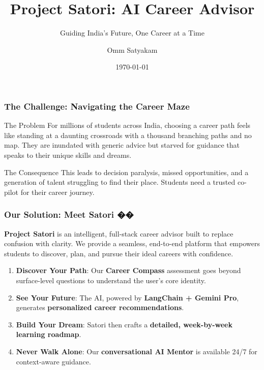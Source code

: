 \documentclass{beamer}
\title[Project Satori]{Project Satori: AI Career Advisor}
\subtitle{Guiding India's Future, One Career at a Time}
\author{Omm Satyakam}
\institute{Team Satori}
\date{\today}
\begin{document}
\begin{frame}
  \titlepage
\end{frame}

\begin{frame}
  \frametitle{The Challenge: Navigating the Career Maze}
  \begin{block}{The Problem}
    For millions of students across India, choosing a career path feels like standing at a daunting crossroads with a thousand branching paths and no map. They are inundated with generic advice but starved for guidance that speaks to their unique skills and dreams.
  \end{block}
  \begin{alertblock}{The Consequence}
    This leads to decision paralysis, missed opportunities, and a generation of talent struggling to find their place. Students need a trusted co-pilot for their career journey.
  \end{alertblock}
\end{frame}

\begin{frame}
  \frametitle{Our Solution: Meet Satori ��}
  \textbf{Project Satori} is an intelligent, full-stack career advisor built to replace confusion with clarity. We provide a seamless, end-to-end platform that empowers students to discover, plan, and pursue their ideal careers with confidence.
  \vspace{0.5cm}
  \begin{enumerate}
  \item \textbf{Discover Your Path}: Our \textbf{Career Compass} assessment goes beyond surface-level questions to understand the user's core identity.
  \item \textbf{See Your Future}: The AI, powered by \textbf{LangChain + Gemini Pro}, generates \textbf{personalized career recommendations}.
  \item \textbf{Build Your Dream}: Satori then crafts a \textbf{detailed, week-by-week learning roadmap}.
  \item \textbf{Never Walk Alone}: Our \textbf{conversational AI Mentor} is available 24/7 for context-aware guidance.
  \end{enumerate}
\end{frame}
\end{document}
